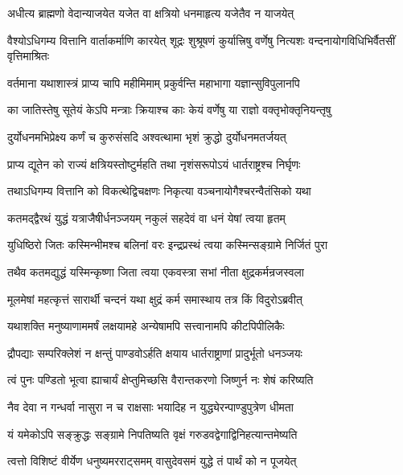 \twolineshloka
{अधीत्य ब्राह्मणो वेदान्याजयेत यजेत वा}
{क्षत्रियो धनमाहृत्य यजेतैव न याजयेत्}


\onelineshloka
{वैश्योऽधिगम्य वित्तानि वार्ताकर्माणि कारयेत्}
\twolineshloka
{शूद्रः शुश्रूषणं कुर्यात्त्रिषु वर्णेषु नित्यशः}
{वन्दनायोगविधिभिर्वैतसीं वृत्तिमाश्रितः}


\twolineshloka
{वर्तमाना यथाशास्त्रं प्राप्य चापि महीमिमाम्}
{प्रकुर्वन्ति महाभागा यज्ञान्सुविपुलानपि}


\twolineshloka
{का जातिस्तेषु सूतेयं केऽपि मन्त्राः क्रियाश्च काः}
{केयं वर्णेषु या राज्ञो वक्तृभोक्तृनियन्तृषु}



\twolineshloka
{दुर्योधनमभिप्रेक्ष्य कर्णं च कुरुसंसदि}
{अश्वत्थामा भृशं क्रुद्धो दुर्योधनमतर्जयत्}


\twolineshloka
{प्राप्य द्यूतेन को राज्यं क्षत्रियस्तोष्टुर्महति}
{तथा नृशंसरूपोऽयं धार्तराष्ट्रश्च निर्घृणः}


\twolineshloka
{तथाऽधिगम्य वित्तानि को विकत्थेद्विचक्षणः}
{निकृत्या वञ्चनायोगैश्चरन्वैतंसिको यथा}


\twolineshloka
{कतमद्द्वैरथं युद्धं यत्राजैषीर्धनञ्जयम्}
{नकुलं सहदेवं वा धनं येषां त्वया हृतम्}


\twolineshloka
{युधिष्ठिरो जितः कस्मिन्भीमश्च बलिनां वरः}
{इन्द्रप्रस्थं त्वया कस्मिन्सङ्ग्रामे निर्जितं पुरा}


\twolineshloka
{तथैव कतमद्युद्धं यस्मिन्कृष्णा जिता त्वया}
{एकवस्त्रा सभां नीता क्षुद्रकर्मन्रजस्वला}


\twolineshloka
{मूलमेषां महत्कृत्तं सारार्थी चन्दनं यथा}
{क्षुद्रं कर्म समास्थाय तत्र किं विदुरोऽब्रवीत्}


\twolineshloka
{यथाशक्ति मनुष्याणाममर्षं लक्षयामहे}
{अन्येषामपि सत्त्वानामपि कीटपिपीलिकैः}


\twolineshloka
{द्रौपद्याः सम्परिक्लेशं न क्षन्तुं पाण्डवोऽर्हति}
{क्षयाय धार्तराष्ट्राणां प्रादुर्भूतो धनञ्जयः}


\twolineshloka
{त्वं पुनः पण्डितो भूत्वा ह्याचार्यं क्षेप्तुमिच्छसि}
{वैरान्तकरणो जिष्णुर्न नः शेषं करिष्यति}


\twolineshloka
{नैव देवा न गन्धर्वा नासुरा न च राक्षसाः}
{भयादिह न युद्ध्येरन्पाण्डुपुत्रेण धीमता}


\twolineshloka
{यं यमेकोऽपि सङ्क्रुद्धः सङ्ग्रामे निपतिष्यति}
{वृक्षं गरुडवद्वेगाद्विनिहत्यान्तमेष्यति}


\twolineshloka
{त्वत्तो विशिष्टं वीर्येण धनुष्यमरराट्समम्}
{वासुदेवसमं युद्धे तं पार्थं को न पूजयेत्}


